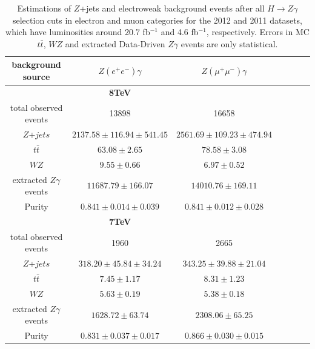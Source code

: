 \begin{table}[!htbp]
\centering
\begin{tabular}{ccccccc}
       \hline
       \textbf{background source } & $Z(e^{+}e^{-})\gamma$  & $ Z( \mu^{+}\mu^{-})\gamma$ \\
       \hline
 	  &   {\bf 8TeV} &  \\
       \hline
	   
      total observed events & 13898    &  16658 \\
       \hline
        $Z$+$jets$             & $ 2137.58 \pm 116.94 \pm 541.45  $ &  $ 2561.69 \pm 109.23  \pm 474.94 $  \\
       $t\bar t$            &  $ 63.08 \pm 2.65 $&  $ 78.58 \pm 3.08 $ \\
 	$WZ $   	     &  $ 9.55 \pm 0.66 $ &  $ 6.97 \pm 0.52 $    \\
       \hline
   extracted $Z\gamma$ events  & $ 11687.79 \pm 166.07  $ &   $ 14010.76 \pm 169.11 $  \\
       \hline
 	Purity   		&  $ 0.841 \pm 0.014 \pm 0.039 $             &  $ 0.841 \pm  0.012 \pm 0.028$    \\
       \hline	 
       \hline
 	  &   {\bf 7TeV} &  \\
       \hline

      total observed events & 1960    &  2665 \\
       \hline
        $Z$+$jets$             & $ 318.20 \pm 45.84 \pm 34.24  $ &  $ 343.25 \pm 39.88  \pm 21.04 $  \\
       $t\bar t$            &  $ 7.45 \pm 1.17 $&  $ 8.31 \pm 1.23 $ \\
        $WZ $                &  $ 5.63 \pm 0.19 $ &  $ 5.38 \pm 0.18 $    \\
       \hline
   extracted $Z\gamma$ events  & $ 1628.72 \pm 63.74  $ &   $ 2308.06 \pm 65.25 $  \\
       \hline
        Purity                  &  $ 0.831 \pm 0.037 \pm 0.017 $             &  $ 0.866 \pm  0.030 \pm 0.015$    \\
   \hline
   \hline
      

\end{tabular}
\caption{
 Estimations of $Z$+jets and electroweak background events after all $H\rightarrow Z \gamma$ selection cuts in electron and muon categories for the 2012 and 2011 datasets, which have luminosities around 20.7 fb$^{-1}$ and 4.6 fb$^{-1}$, respectively. Errors in MC $t\bar{t}$, $WZ$ and extracted Data-Driven $Z\gamma$ events are only statistical.}
  \label{tab:zgbgsummary}
\end{table}

